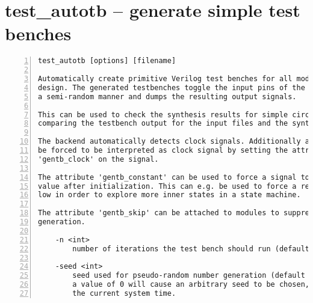 \section{test\_autotb -- generate simple test benches}
\label{cmd:test_autotb}
\begin{lstlisting}[numbers=left,frame=single]
    test_autotb [options] [filename]

Automatically create primitive Verilog test benches for all modules in the
design. The generated testbenches toggle the input pins of the module in
a semi-random manner and dumps the resulting output signals.

This can be used to check the synthesis results for simple circuits by
comparing the testbench output for the input files and the synthesis results.

The backend automatically detects clock signals. Additionally a signal can
be forced to be interpreted as clock signal by setting the attribute
'gentb_clock' on the signal.

The attribute 'gentb_constant' can be used to force a signal to a constant
value after initialization. This can e.g. be used to force a reset signal
low in order to explore more inner states in a state machine.

The attribute 'gentb_skip' can be attached to modules to suppress testbench
generation.

    -n <int>
        number of iterations the test bench should run (default = 1000)

    -seed <int>
        seed used for pseudo-random number generation (default = 0).
        a value of 0 will cause an arbitrary seed to be chosen, based on
        the current system time.
\end{lstlisting}

